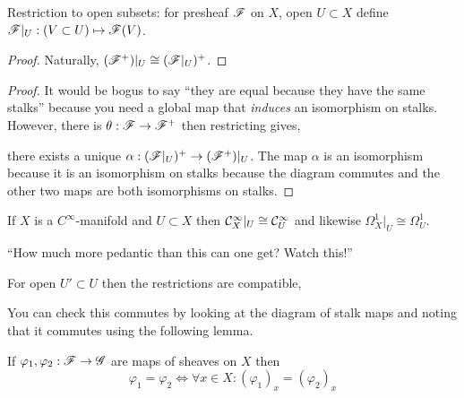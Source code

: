 \documentclass[12pt]{article}
\begin{document}
Restriction to open subsets: for presheaf $\mathscr{F}$ on $X$, open $U \subset X$ define $\mathscr{F}|_U : (V \subset U) \mapsto \mathscr{F}(V)$.

\begin{proof}
Naturally, $(\mathscr{F}^+)|_U \cong (\mathscr{F}|_U)^+$. 
\end{proof}

\begin{proof}
It would be bogus to say ``they are equal because they have the same stalks'' because you need a global map that \textit{induces} an isomorphism on stalks. However, there is $\theta : \mathscr{F} \to \mathscr{F}^+$ then restricting gives,
\begin{center}
\end{center}
there exists a unique $\alpha : (\mathscr{F}|_U)^+ \to (\mathscr{F}^+)|_U$. The map $\alpha$ is an isomorphism because it is an isomorphism on stalks because the diagram commutes and the other two maps are both isomorphisms on stalks.
\end{proof}

\begin{example}
If $X$ is a $C^\infty$-manifold and $U \subset X$ then $\mathcal{C}^\infty_X|_U \cong \mathcal{C}^{\infty}_U$ and likewise $\Omega^1_X|_U \cong \Omega^1_U$.
\end{example}

``How much more pedantic than this can one get? Watch this!''

\begin{rmk}
For open $U' \subset U$ then the restrictions are compatible,
\begin{center}
\end{center}
You can check this commutes by looking at the diagram of stalk maps and noting that it commutes using the following lemma.
\end{rmk}

\begin{lemma}
If $\varphi_1, \varphi_2 : \mathscr{F} \to \mathscr{G}$ are maps of sheaves on $X$ then \[ \varphi_1 = \varphi_2 \iff \forall x \in X : (\varphi_1)_x = (\varphi_2)_x \]
\end{lemma}
\end{document}
